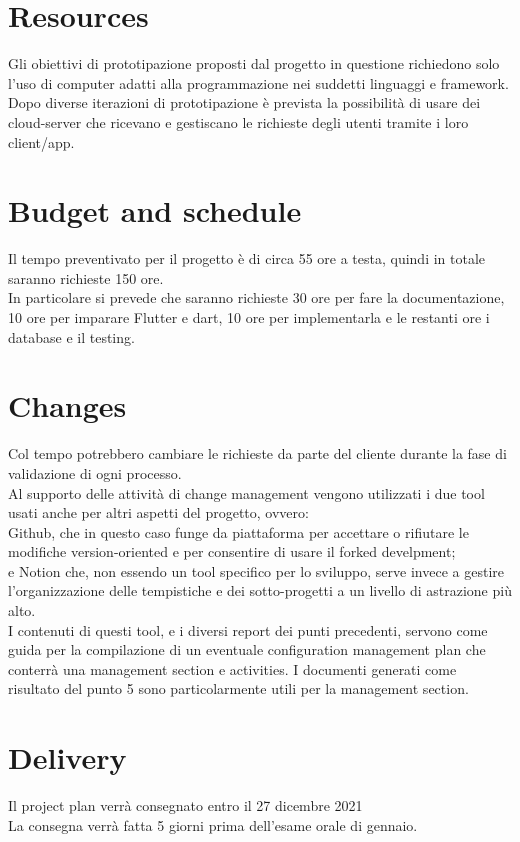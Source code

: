 \documentclass{article}
\begin{document}
\section{Resources}
Gli obiettivi di prototipazione proposti dal progetto in questione richiedono solo l'uso di computer adatti alla programmazione nei suddetti linguaggi e framework.
Dopo diverse iterazioni di prototipazione è prevista la possibilità di usare dei cloud-server che ricevano e gestiscano le richieste degli utenti tramite i loro client/app. 

\section{Budget and schedule}
Il tempo preventivato per il progetto è di circa 55 ore a testa, quindi in totale saranno richieste 150 ore.
\\In particolare si prevede che saranno richieste 30 ore per fare la documentazione, 10 ore per imparare Flutter e dart, 10 ore per implementarla
e le restanti ore i database e il testing.
\section{Changes}
Col tempo potrebbero cambiare le richieste da parte del cliente durante la fase di validazione di ogni processo.
\\Al supporto delle attività di change management vengono utilizzati i due tool usati anche per altri aspetti del progetto, ovvero: 
\\Github, che in questo caso funge da piattaforma per accettare o rifiutare le modifiche version-oriented e per consentire di usare il forked develpment; 
\\e Notion che, non essendo un tool specifico per lo sviluppo, serve invece a gestire l’organizzazione delle tempistiche e dei sotto-progetti a un livello di astrazione più alto.
\\I contenuti di questi tool, e i diversi report dei punti precedenti, servono come guida per la compilazione di un eventuale configuration management plan che conterrà una management section e activities. I documenti generati come risultato del punto 5 sono particolarmente utili per la management section.

\section{Delivery}
Il project plan verrà consegnato entro il 27 dicembre 2021
\\La consegna verrà fatta 5 giorni prima dell'esame orale di gennaio.
\end{document}
